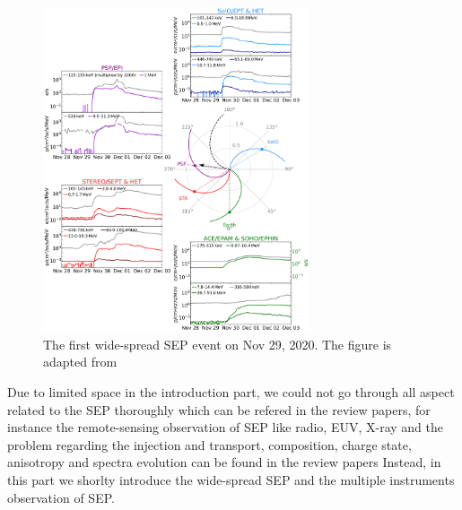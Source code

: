 \begin{figure}
	\centering
	\includegraphics[width = 0.7\textwidth, height = 0.5\textheight]{images/2020-11-29_overview_plot.png}
	\caption{The first wide-spread \acl{SEP} event on Nov 29, 2020. The figure is adapted from \citet{Kollhoff-2021}}
	\label{Fig:SEP_widespread}
\end{figure}

Due to limited space in the introduction part, we could not go through all aspect 
related to the \ac{SEP} thoroughly which can be refered in the review papers, for instance the remote-sensing observation of SEP like radio, EUV, X-ray and the problem regarding the injection and transport, composition, charge state, anisotropy and spectra evolution can be found in the review papers \citep{reames2013two, Desai_Diacalone2016LRSP, Reames2021LNP}
Instead, in this part we shorlty introduce the wide-spread \ac{SEP} and the multiple instruments observation of \ac{SEP}.

